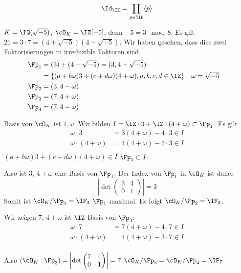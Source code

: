 
\renewcommand{\lecdate}{12.11.14}

\begin{Beispiel}
 \[\Id_\IZ = \prod_{p\in\IP}\langle p\rangle\]
\end{Beispiel}

\begin{Beispiel}
 $K=\IQ(\sqrt{-5})$, $\cO_K=\IZ[-5]$, denn $-5=3\mod{8}$. Es gilt $21=3\cdot 7=(4+\sqrt{-5})(4-\sqrt{-5})$. Wir haben gesehen, dass dies zwei Faktorisierungen in irreduzible Faktoren sind.
 \begin{align*}
 \Fp_1&=(3)+(4+\sqrt{-5})=(3,4+\sqrt{-5})\\
 &=\{(a+b\omega)3+(c+d\omega)(4+\omega), a,b,c,d\in\IZ\} && \omega=\sqrt{-5}\\
 \Fp_2&=(3,4-\omega)\\
 \Fp_3&=(7,4+\omega)\\
 \Fp_4&=(7,4-\omega)
 \end{align*}
 
 Basis von $\cO_K$ ist $1,\omega$. Wir bilden $I=\IZ\cdot 3+\IZ\cdot (4+\omega)\subset \Fp_1$. Es gilt 
 \begin{align*}
    \omega\cdot 3&=3(4+\omega)-4\cdot 3\in I\\
    \omega\cdot (4+\omega)&=4(4+\omega)-7\cdot 3\in I\\
 \end{align*}
 \folge $(a+b\omega)3+(c+d\omega)(4+\omega)\in I$ \folge $\Fp_1\subset I$.
 
 Also ist $3$, $4+\omega$ eine Basis von $\Fp_1$. Der Index von $\Fp_1$ in $\cO_K$ ist daher \[ \left|\det\begin{pmatrix} 3 & 4\\ 0 & 1 \end{pmatrix} \right|=3\]
 Somit ist $\cO_K/\Fp_1=\IF_3$ \folge $\Fp_1$ maximal. Es folgt $\cO_K/\Fp_2=\IF_3$.
 
 Wir zeigen $7$, $4+\omega$ ist $\IZ$-Basis von $\Fp_3$:
  \begin{align*}
    \omega\cdot 7&=7(4+\omega)-4\cdot 7\in I\\
    \omega\cdot (4+\omega)&=4(4+\omega)-3\cdot 7\in I\\
 \end{align*}
 
 Also $(\cO_K : \Fp_3)=\left|\det\begin{pmatrix}
                                  7 & 4\\ 0& 1
                                 \end{pmatrix}\right|=7$ \folge $\cO_K/\Fp_3=\cO_K/\Fp_4=\IF_7$


\end{Beispiel}
